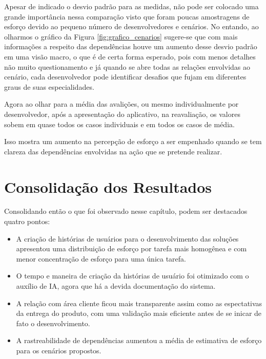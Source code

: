 	Apesar de indicado o desvio padrão para as medidas, não pode ser colocado uma grande importância nessa comparação visto que foram poucas amostragens de esforço devido ao pequeno número de desenvolvedores e cenários.
	No entando, ao olharmos o gráfico da Figura \ref{fig:grafico_cenarios} sugere-se que com mais informações a respeito das dependências houve um aumento desse desvio padrão em uma visão macro, o que é de certa forma esperado,
	pois com menos detalhes não muito questionamento e já quando se abre todas as relações envolvidas ao cenário, cada desenvolvedor pode identificar desafios que fujam em diferentes graus de suas especialidades.

	Agora ao olhar para a média das avalições, ou mesmo individualmente por
	desenvolvedor, após a apresentação do aplicativo, na reavaliação, os valores sobem em quase todos os casos individuais e em todos os casos de média.

	Isso mostra um aumento na percepção de esforço a ser empenhado quando se tem clareza das dependências envolvidas na ação que se pretende realizar.

	\section{Consolidação dos Resultados}

	Consolidando então o que foi observado nesse capítulo, podem ser destacados quatro pontos:

	\begin{itemize}
		\item A criação de histórias de usuários para o desenvolvimento das soluções apresentou uma distribuição de esforço por tarefa mais homogênea e com menor concentração de esforço para uma única tarefa.
		\item O tempo e maneira de criação da histórias de usuário foi otimizado com o auxílio de IA, agora que há a devida documentação do sistema.
		\item A relação com área cliente ficou mais transparente assim como as espectativas da entrega do produto, com uma validação mais eficiente antes de se inicar de fato o desenvolvimento.
		\item A rastreabilidade de dependências aumentou a média de estimativa de esforço para os cenários propostos.
	\end{itemize}